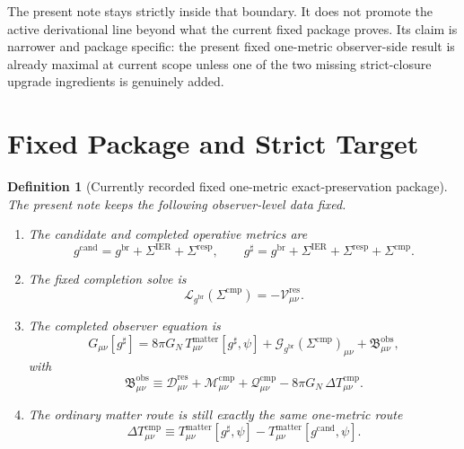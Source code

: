 \documentclass[11pt]{article}
\newcommand{\ObserverMetric}{g^{\mathrm{br}}}
\newcommand{\CandidateMetric}{g^{\mathrm{cand}}}
\newcommand{\CompletedMetric}{g^{\sharp}}
\newcommand{\BaseShift}{\Sigma^{\mathrm{IER}}}
\newcommand{\ResponseShift}{\Sigma^{\mathrm{resp}}}
\newcommand{\CompShift}{\Sigma^{\mathrm{cmp}}}
\newcommand{\ResidualCore}{\mathcal V_{\mu\nu}^{\mathrm{res}}}
\newcommand{\ResidualDec}{\mathcal D_{\mu\nu}^{\mathrm{res}}}
\newcommand{\ReducedEin}{\mathcal L_{\ObserverMetric}}
\newcommand{\GaugeBook}{\mathcal G_{\ObserverMetric}}
\newcommand{\CompMix}{\mathcal M_{\mu\nu}^{\mathrm{cmp}}}
\newcommand{\CompQuad}{\mathcal Q_{\mu\nu}^{\mathrm{cmp}}}
\newcommand{\DeltaTComp}{\Delta T_{\mu\nu}^{\mathrm{cmp}}}
\newcommand{\ObsBurden}{\mathfrak B_{\mu\nu}^{\mathrm{obs}}}
\newtheorem{definition}{Definition}
\begin{document}
The present note stays strictly inside that boundary. It does not promote the active derivational line beyond what the current fixed package proves. Its claim is narrower and package specific: the present fixed one-metric observer-side result is already maximal at current scope unless one of the two missing strict-closure upgrade ingredients is genuinely added.

\section{Fixed Package and Strict Target}

\begin{definition}[Currently recorded fixed one-metric exact-preservation package]
\label{def:fixed}
The present note keeps the following observer-level data fixed.
\begin{enumerate}
    \item The candidate and completed operative metrics are
    \begin{equation}
    \CandidateMetric
    =
    \ObserverMetric+\BaseShift+\ResponseShift,
    \qquad
    \CompletedMetric
    =
    \ObserverMetric+\BaseShift+\ResponseShift+\CompShift.
    \label{eq:metrics}
    \end{equation}
    \item The fixed completion solve is
    \begin{equation}
    \ReducedEin(\CompShift)=-\ResidualCore.
    \label{eq:solve}
    \end{equation}
    \item The completed observer equation is
    \begin{equation}
    G_{\mu\nu}[\CompletedMetric]
    =
    8\pi G_N\,T_{\mu\nu}^{\mathrm{matter}}[\CompletedMetric,\psi]
    +\GaugeBook(\CompShift)_{\mu\nu}
    +\ObsBurden,
    \label{eq:completed}
    \end{equation}
    with
    \begin{equation}
    \ObsBurden
    \equiv
    \ResidualDec+\CompMix+\CompQuad-8\pi G_N\,\DeltaTComp.
    \label{eq:burden}
    \end{equation}
    \item The ordinary matter route is still exactly the same one-metric route
    \begin{equation}
    \DeltaTComp
    \equiv
    T_{\mu\nu}^{\mathrm{matter}}[\CompletedMetric,\psi]
    -
    T_{\mu\nu}^{\mathrm{matter}}[\CandidateMetric,\psi].
    \label{eq:deltatcomp}
    \end{equation}

\end{enumerate}
\end{definition}
\end{document}
